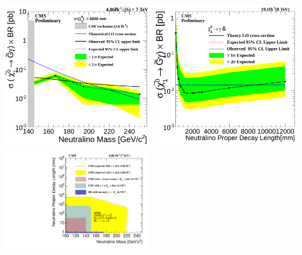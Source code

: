 \begin{center}
\includegraphics[width=0.49\textwidth,height=0.5\textwidth]{THESISPLOTS/Neutralino_XsecVsMAss_Exclusion_limit_6000.png}
\includegraphics[width=0.49\textwidth,height=0.5\textwidth]{THESISPLOTS/Neutralino_CrossSecTimesBR_Uplimit.png}
\includegraphics[width=0.49\textwidth,height=0.5\textwidth]{THESISPLOTS/Neutralino_2D_exclusion.pdf} 
    \label{fig:limits}
\end{center}


